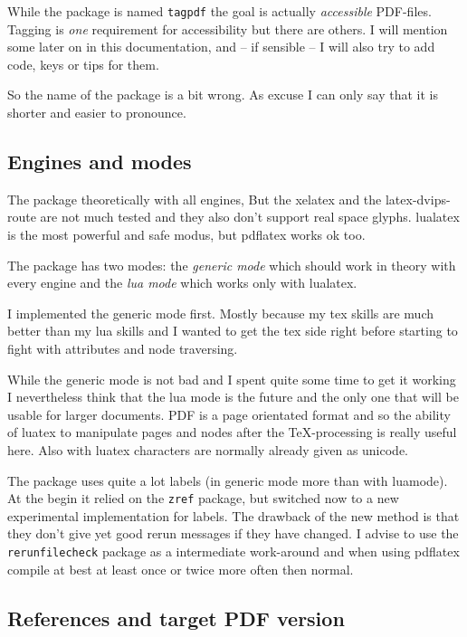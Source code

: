\documentclass[DIV=12,parskip=half-,bibliography=totoc,a4paper]{article}
\newcommand\pkg[1]{\texttt{#1}}
\newcommand\PDF{PDF}
\begin{document}
While the package is named \texttt{tagpdf} the goal is actually \emph{accessible} \PDF{}-files. Tagging is \emph{one} requirement for accessibility but there are others. I will mention some later on in this documentation, and -- if sensible -- I will also try to add code, keys or tips for them.

So the name of the package is a bit wrong. As excuse I can only say that it is shorter and easier to pronounce.


\subsection{Engines and modes}

The package theoretically with all engines,
But the xelatex and the latex-dvips-route are not much tested and they also don't support
real space glyphs. lualatex is the most powerful and safe modus, but pdflatex works ok too.

The package has two modes: the \emph{generic mode} which should work in theory with every engine and the \emph{lua mode} which works only with lualatex.

I implemented the generic mode first. Mostly because my tex skills are much better than my lua skills and I wanted to get the tex side right before starting to fight with attributes and node traversing.

While the generic mode is not bad and I spent quite some time to get it working I nevertheless think that the lua mode is the future and the only one that will be usable for larger documents. \PDF{} is a page orientated format and so the ability of luatex to manipulate pages and nodes after the \TeX-processing is really useful here. Also with luatex characters are normally already given as unicode.

The package uses quite a lot labels (in generic mode more than with luamode). At the begin it relied on the \pkg{zref} package, but switched now to a new experimental implementation for labels. The drawback of the new method is that they don't give yet good rerun messages if they have changed. I advise to use the \pkg{rerunfilecheck} package as a intermediate work-around and when using pdflatex compile
at best at least once or twice more often then normal.


\subsection{References and target PDF version}
\end{document}
